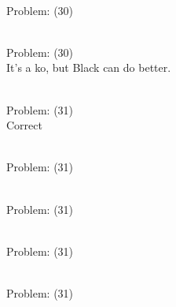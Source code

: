 \documentclass[11pt]{article}
\begin{document}
\begin{minipage}[t]{0.5\textwidth}
  {\centering
  
\\
Problem: (30)\\
  }
\end{minipage}
\begin{minipage}[t]{0.5\textwidth}
  {\centering
  
\\
Problem: (30)\\
It's a ko, but Black can do better.\\
  }
\end{minipage}
\begin{minipage}[t]{0.5\textwidth}
  {\centering
  
\\
Problem: (31)\\
Correct\\
  }
\end{minipage}
\begin{minipage}[t]{0.5\textwidth}
  {\centering
  
\\
Problem: (31)\\
  }
\end{minipage}
\begin{minipage}[t]{0.5\textwidth}
  {\centering
  
\\
Problem: (31)\\
  }
\end{minipage}
\begin{minipage}[t]{0.5\textwidth}
  {\centering
  
\\
Problem: (31)\\
  }
\end{minipage}
\begin{minipage}[t]{0.5\textwidth}
  {\centering
  
\\
Problem: (31)\\
  }
\end{minipage}
\end{document}
